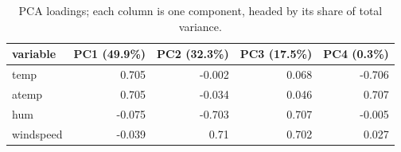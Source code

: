 \begin{table}[htbp]
\centering
\caption{PCA loadings; each column is one component, headed by its share of total variance.}\label{tab:pca-loadings}
\begin{tabular}{lrrrr}
\toprule
variable & PC1 (49.9\%) & PC2 (32.3\%) & PC3 (17.5\%) & PC4 (0.3\%) \\
\midrule
temp & 0.705 & -0.002 & 0.068 & -0.706 \\
atemp & 0.705 & -0.034 & 0.046 & 0.707 \\
hum & -0.075 & -0.703 & 0.707 & -0.005 \\
windspeed & -0.039 & 0.71 & 0.702 & 0.027 \\
\bottomrule
\end{tabular}
\end{table}
